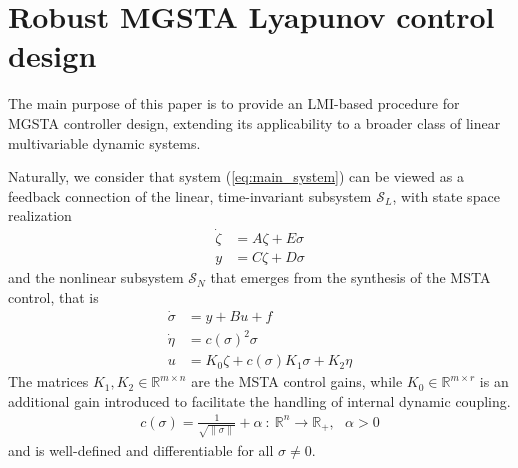 \documentclass[twocolumn]{autarc_LH}
\begin{document}
\section{Robust MGSTA Lyapunov control design}

The main purpose of this paper is to provide an LMI-based procedure for MGSTA controller design, extending its applicability to a broader class of linear multivariable dynamic systems. 

Naturally, we consider that system (\ref{eq:main_system}) can be viewed as a feedback connection of the linear, time-invariant subsystem $\mathcal{S}_L$, with state space realization
\begin{align} 
\label{eq17} \dot \zeta & = A\zeta + E \sigma \\
\label{eq18} y & = C \zeta  + D \sigma 
\end{align} 
and the nonlinear subsystem $\mathcal{S}_{N}$ that emerges from the synthesis of the MSTA control, that is 
\begin{align} 
\label{eq19} \dot \sigma & = y + B u + f \\
\label{eq21}   \dot \eta &  = c(\sigma)^2 \sigma \\
\label{eq20}   u & = K_0 \zeta + c(\sigma) K_1 \sigma + K_2 \eta  
\end{align}
The matrices $K_1, K_2 \in \mathbb{R}^{m \times n}$
are the MSTA control gains, while $K_0 \in \mathbb{R}^{m \times r} $
is an additional gain introduced to facilitate the handling of internal dynamic coupling. %
{\color{black}{The positive scalar function $c(\sigma)$ is given by}}
 \begin{align} \label{eq22}
c(\sigma) = \frac{1}{\sqrt{\|\sigma\|}}  + \alpha ~:~\mathbb{R}^n \rightarrow \mathbb{R}_+, \ \ \ \alpha > 0 
\end{align}
and is well-defined and differentiable for all $\sigma \neq 0$.
\end{document}
